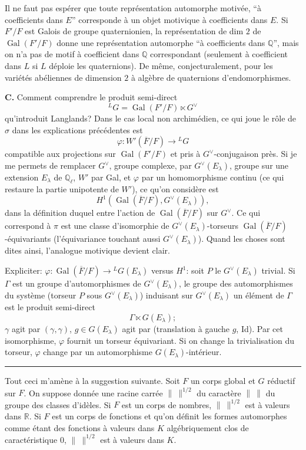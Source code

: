 \documentclass[11pt]{article}
\newcommand{\Gal}{\operatorname{Gal}}
\newcommand{\Fbar}{\overline F}
\newcommand{\normchar}{\|\ \|}
\newcommand{\LG}{{}^{L}G}
\begin{document}
Il ne faut pas espérer que toute représentation automorphe motivée, ``à coefficients dans \(E\)'' corresponde à un objet motivique à coefficients dans \(E\). Si \(F'/F\) est Galois de groupe quaternionien, la représentation de dim \(2\) de \(\Gal(F'/F)\) donne une représentation automorphe ``à coefficients dans \(\mathbb Q\)'', mais on n'a pas de motif à coefficient dans \(\mathbb Q\) correspondant (seulement à coefficient dans \(L\) si \(L\) déploie les quaternions). De même, conjecturalement, pour les variétés abéliennes de dimension \(2\) à algèbre de quaternions d'endomorphismes.

\textbf{C.} Comment comprendre le produit semi-direct
\[
\LG=\Gal(F'/F)\ltimes G^\vee
\]
qu'introduit Langlands? Dans le cas local non archimédien, ce qui joue le rôle de \(\sigma\) dans les explications précédentes est
\[
\varphi:W'(\Fbar/F)\longrightarrow \LG
\]
compatible aux projections sur \(\Gal(F'/F)\) et pris à \(G^\vee\)-conjugaison près. Si je me permets de remplacer \(G^\vee\), groupe complexe, par \(G^\vee(E_\lambda)\), groupe sur une extension \(E_\lambda\) de \(\mathbb Q_\ell\), \(W'\) par Gal, et \(\varphi\) par un homomorphisme continu (ce qui restaure la partie unipotente de \(W'\)), ce qu'on considère est
\[
H^1(\Gal(\Fbar/F),G^\vee(E_\lambda)),
\]
dans la définition duquel entre l'action de \(\Gal(\Fbar/F)\) sur \(G^\vee\). Ce qui correspond à \(\pi\) est une classe d'isomorphie de \(G^\vee(E_\lambda)\)-torseurs \(\Gal(\Fbar/F)\)-équivariants (l'équivariance touchant aussi \(G^\vee(E_\lambda)\)). Quand les choses sont dites ainsi, l'analogue motivique devient clair.

Expliciter: \(\varphi:\Gal(\Fbar/F)\to \LG(E_\lambda)\) versus \(H^1\): soit \(P\) le \(G^\vee(E_\lambda)\) trivial. Si \(\Gamma\) est un groupe d'automorphismes de \(G^\vee(E_\lambda)\), le groupe des automorphismes du système (torseur \(P\) sous \(G^\vee(E_\lambda)\)) induisant sur \(G^\vee(E_\lambda)\) un élément de \(\Gamma\) est le produit semi-direct
\[
\Gamma\ltimes G(E_\lambda);
\]
\(\gamma\) agit par \((\gamma,\gamma)\), \(g\in G(E_\lambda)\) agit par (translation à gauche \(g\), Id). Par cet isomorphisme, \(\varphi\) fournit un torseur équivariant. Si on change la trivialisation du torseur, \(\varphi\) change par un automorphisme \(G(E_\lambda)\)-intérieur.

\bigskip
\begin{center}\rule{0.32\linewidth}{0.4pt}\end{center}
\bigskip

Tout ceci m'amène à la suggestion suivante. Soit \(F\) un corps global et \(G\) réductif sur \(F\). On suppose donnée une racine carrée \(\normchar^{1/2}\) du caractère \(\normchar\) du groupe des classes d'idèles. Si \(F\) est un corps de nombres, \(\normchar^{1/2}\) est à valeurs dans \(\mathbb R\). Si \(F\) est un corps de fonctions et qu'on définit les formes automorphes comme étant des fonctions à valeurs dans \(K\) algébriquement clos de caractéristique \(0\), \(\normchar^{1/2}\) est à valeurs dans \(K\).
\end{document}

